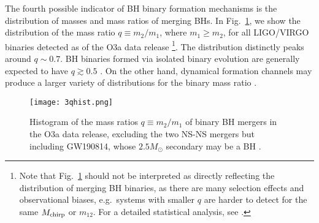 \documentclass[
        fleqn,
        usenatbib,
    ]{mnras}
\begin{document}
The fourth possible indicator of BH binary formation mechanisms is the
distribution of masses and mass ratios of merging BHs. In Fig.~\ref{fig:qhist},
we show the distribution of the mass ratio $q \equiv m_2 / m_1$, where $m_1 \geq
m_2$, for all LIGO/VIRGO binaries detected as of the O3a data release
\citep{LIGOO3a}\footnote{Note that Fig.~\ref{fig:qhist} should
not be interpreted as directly reflecting the distribution of merging BH
binaries, as there are many selection effects and observational biases, e.g.\
systems with smaller $q$ are harder to detect for the same $M_{\rm chirp}$ or
$m_{12}$. For a detailed statistical analysis, see \citet{LIGOO3a}.}. The
distribution distinctly peaks around $q \sim 0.7$. BH binaries formed via
isolated binary evolution are generally expected to have $q \gtrsim 0.5$
\citep{belczynski2016first, olejak2020}. On the other hand, dynamical formation
channels may produce a larger variety of distributions for the binary mass ratio
\citep[e.g.,][]{rodriguez2016binary, silsbee2017lidov, fragione2019}.

\begin{figure}
    \centering
    \texttt{[image: 3qhist.png]}
    \caption{Histogram of the mass ratios $q \equiv m_2 / m_1$ of binary BH
    mergers in the O3a data release, excluding the two NS-NS mergers but including
    GW190814, whose $2.5M_{\odot}$ secondary may be a BH \citep{LIGOO3a}.
    }\label{fig:qhist}
\end{figure}
\end{document}
